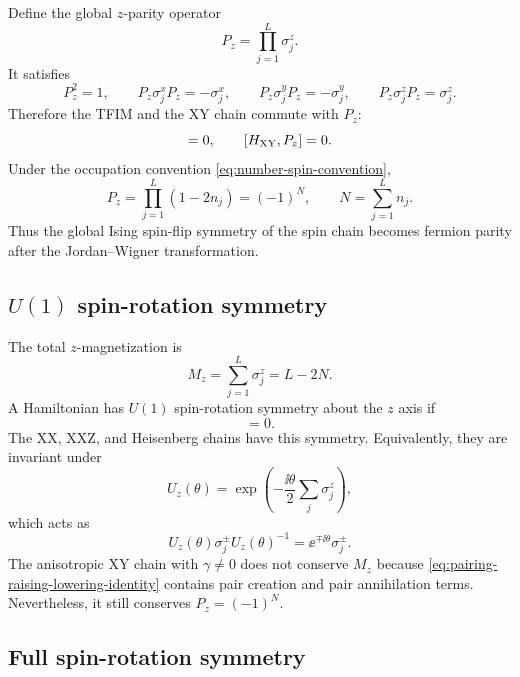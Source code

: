 Define the global $z$-parity operator
\begin{equation}
\label{eq:global-z-parity}
    P_z
    =
    \prod_{j=1}^{L}\sigma_j^z.
\end{equation}
It satisfies
\begin{equation}
    P_z^2=1,
    \qquad
    P_z\sigma_j^xP_z=-\sigma_j^x,
    \qquad
    P_z\sigma_j^yP_z=-\sigma_j^y,
    \qquad
    P_z\sigma_j^zP_z=\sigma_j^z.
\end{equation}
Therefore the TFIM and the XY chain commute with $P_z$:
\begin{equation}
    [H_{\rm TFIM},P_z]=0,
    \qquad
    [H_{\rm XY},P_z]=0.
\end{equation}
Under the occupation convention \cref{eq:number-spin-convention},
\begin{equation}
    P_z
    =
    \prod_{j=1}^{L}(1-2n_j)
    =
    (-1)^N,
    \qquad
    N=\sum_{j=1}^{L}n_j.
\end{equation}
Thus the global Ising spin-flip symmetry of the spin chain becomes fermion parity
after the Jordan--Wigner transformation.

\subsection{\texorpdfstring{$U(1)$}{U(1)} spin-rotation symmetry}

The total $z$-magnetization is
\begin{equation}
    M_z=\sum_{j=1}^{L}\sigma_j^z=L-2N.
\end{equation}
A Hamiltonian has $U(1)$ spin-rotation symmetry about the $z$ axis if
\begin{equation}
    [H,M_z]=0.
\end{equation}
The XX, XXZ, and Heisenberg chains have this symmetry. Equivalently, they are
invariant under
\begin{equation}
    U_z(\theta)
    =
    \exp\!\left(-\frac{\ii\theta}{2}\sum_j\sigma_j^z\right),
\end{equation}
which acts as
\begin{equation}
    U_z(\theta)\sigma_j^\pm U_z(\theta)^{-1}
    =
    \ee^{\mp\ii\theta}\sigma_j^\pm.
\end{equation}
The anisotropic XY chain with $\gamma\neq0$ does not conserve $M_z$ because
\cref{eq:pairing-raising-lowering-identity} contains pair creation and pair
annihilation terms. Nevertheless, it still conserves $P_z=(-1)^N$.

\subsection{Full spin-rotation symmetry}

